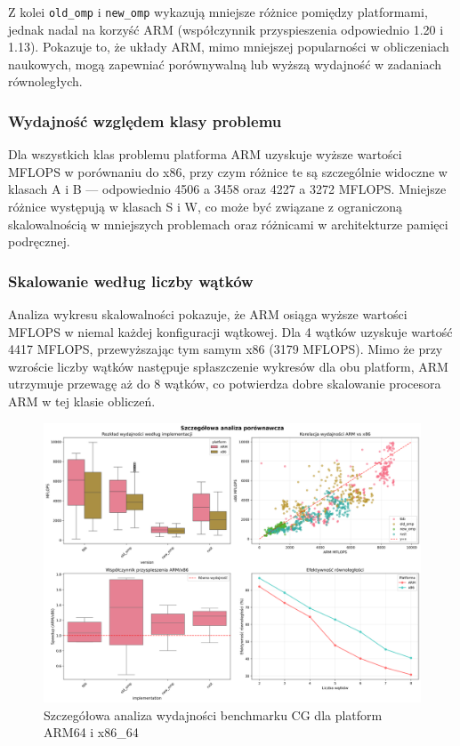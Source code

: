 Z kolei \texttt{old\_omp} i \texttt{new\_omp} wykazują mniejsze różnice pomiędzy platformami, jednak nadal na korzyść ARM (współczynnik przyspieszenia odpowiednio 1.20 i 1.13). Pokazuje to, że układy ARM, mimo mniejszej popularności w obliczeniach naukowych, mogą zapewniać porównywalną lub wyższą wydajność w zadaniach równoległych.
\subsubsection{Wydajność względem klasy problemu}
Dla wszystkich klas problemu platforma ARM uzyskuje wyższe wartości MFLOPS w porównaniu do x86, przy czym różnice te są szczególnie widoczne w klasach A i B — odpowiednio 4506 a 3458 oraz 4227 a 3272 MFLOPS. Mniejsze różnice występują w klasach S i W, co może być związane z ograniczoną skalowalnością w mniejszych problemach oraz różnicami w architekturze pamięci podręcznej.
\subsubsection{Skalowanie według liczby wątków}
Analiza wykresu skalowalności pokazuje, że ARM osiąga wyższe wartości MFLOPS w niemal każdej konfiguracji wątkowej. Dla 4 wątków uzyskuje wartość 4417 MFLOPS, przewyższając tym samym x86 (3179 MFLOPS). Mimo że przy wzroście liczby wątków następuje spłaszczenie wykresów dla obu platform, ARM utrzymuje przewagę aż do 8 wątków, co potwierdza dobre skalowanie procesora ARM w tej klasie obliczeń.

\begin{figure}[H]
    \centering
    \includegraphics[width=\textwidth]{analiza/images/parallel/cg/compare/cg_szczegolowa_analiza_wydajnosci.png}
    \caption{Szczegółowa analiza wydajności benchmarku CG dla platform ARM64 i x86\_64}
    \label{cg_szczegolowa_analiza_wydajnosci}
\end{figure}
